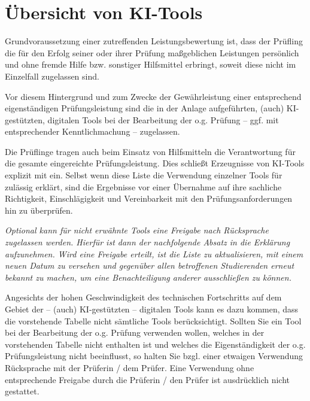 \chapter*{Übersicht von KI-Tools}
\noindent Grundvoraussetzung einer zutreffenden Leistungsbewertung ist, dass der Prüfling die für den Erfolg seiner oder ihrer Prüfung maßgeblichen Leistungen persönlich und ohne fremde Hilfe bzw. sonstiger Hilfsmittel erbringt, soweit diese nicht im Einzelfall zugelassen sind.

\noindent Vor diesem Hintergrund und zum Zwecke der Gewährleistung einer entsprechend eigenständigen Prüfungsleistung sind die in der Anlage aufgeführten, (auch) KI-gestützten, digitalen Tools bei der Bearbeitung der o.g. Prüfung – ggf. mit entsprechender Kenntlichmachung – zugelassen.

\noindent Die Prüflinge tragen auch beim Einsatz von Hilfsmitteln die Verantwortung für die gesamte eingereichte Prüfungsleistung. Dies schließt Erzeugnisse von KI-Tools explizit mit ein. Selbst wenn diese Liste die Verwendung einzelner Tools für zulässig erklärt, sind die Ergebnisse vor einer Übernahme auf ihre sachliche Richtigkeit, Einschlägigkeit und Vereinbarkeit mit den Prüfungsanforderungen hin zu überprüfen.

\noindent\textit{Optional kann für nicht erwähnte Tools eine Freigabe nach Rücksprache zugelassen werden. Hierfür ist dann der nachfolgende Absatz in die Erklärung aufzunehmen. Wird eine Freigabe erteilt, ist die Liste zu aktualisieren, mit einem neuen Datum zu versehen und gegenüber allen betroffenen Studierenden erneut bekannt zu machen, um eine Benachteiligung anderer ausschließen zu können.}

\noindent Angesichts der hohen Geschwindigkeit des technischen Fortschritts auf dem Gebiet der – (auch) KI-gestützten – digitalen Tools kann es dazu kommen, dass die vorstehende Tabelle nicht sämtliche Tools berücksichtigt. Sollten Sie ein Tool bei der Bearbeitung der o.g. Prüfung verwenden wollen, welches in der vorstehenden Tabelle nicht enthalten ist und welches die Eigenständigkeit der o.g. Prüfungsleistung nicht beeinflusst, so halten Sie bzgl. einer etwaigen Verwendung Rücksprache mit der Prüferin / dem Prüfer. Eine Verwendung ohne entsprechende Freigabe durch die Prüferin / den Prüfer ist ausdrücklich nicht gestattet.

